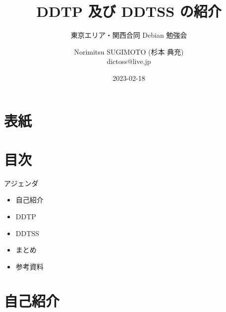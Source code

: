 \title{DDTP 及び DDTSS の紹介}
\subtitle{東京エリア・関西合同 Debian 勉強会} %
\author{Norimitsu SUGIMOTO (杉本 典充) \\dictoss@live.jp}
\date{2023-02-18}



\section{表紙}

\begin{frame}
  \titlepage{}
\end{frame}


\section{目次}

\begin{frame}{アジェンダ}
  \begin{itemize}
  \item 自己紹介
  \item DDTP
  \item DDTSS
  \item まとめ
  \item 参考資料
  \end{itemize}
\end{frame}


\section{自己紹介}

